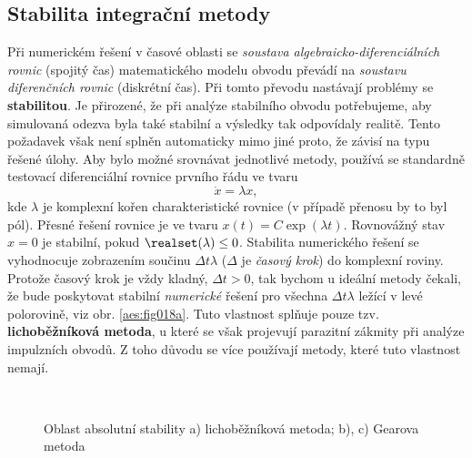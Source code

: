       \subsection{Stabilita integrační metody}
        Při numerickém řešení v časové oblasti se \emph{soustava algebraicko-diferenciálních rovnic}
        (spojitý čas) matematického modelu obvodu převádí na \emph{soustavu diferenčních rovnic}
        (diskrétní čas). Při tomto převodu nastávají problémy se \textbf{stabilitou}. Je přirozené, že
        při analýze stabilního obvodu potřebujeme, aby simulovaná odezva byla také stabilní a výsledky
        tak odpovídaly realitě. Tento požadavek však není splněn automaticky mimo jiné proto, že
        závisí na typu řešené úlohy. Aby bylo možné srovnávat jednotlivé metody, používá se standardně
        testovací diferenciální rovnice prvního řádu ve tvaru
        \begin{equation}\label{aes:eq025}
          \dot{x} = \lambda x, 
        \end{equation}
        kde \(\lambda\) je komplexní kořen charakteristické rovnice (v případě přenosu by to byl
        pól). Přesné řešení rovnice je ve tvaru \(x(t) = C\exp(\lambda t)\). Rovnovážný stav \(x =
        0\) je stabilní, pokud \(\realset(\lambda)\leq0\). Stabilita numerického řešení se
        vyhodnocuje zobrazením součinu \(\Delta t\lambda\) (\(\Delta\) je \emph{časový krok}) do
        komplexní roviny. Protože časový krok je vždy kladný, \(\Delta t>0\), tak bychom u ideální
        metody čekali, že bude poskytovat stabilní \emph{numerické} řešení pro všechna
        \(\Delta t\lambda\) ležící v levé polorovině, viz obr. \ref{aes:fig018a}. Tuto vlastnost
        splňuje pouze tzv. \textbf{lichoběžníková metoda}, u které se však projevují parazitní
        zákmity při analýze impulzních obvodů. Z toho důvodu se více používají metody, které tuto
        vlastnost nemají.

        \begin{figure}[ht!]
          \centering  
              \hspace{1em}            
              \\            
          \caption{Oblast absolutní stability a) lichoběžníková metoda; b), c) Gearova metoda}
          \label{aes:fig018}
        \end{figure}

